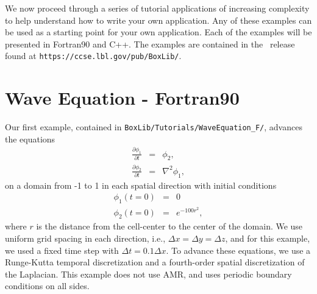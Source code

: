 We now proceed through a series of tutorial applications of increasing complexity
to help understand how to write your own application.  Any of these examples
can be used as a starting point for your own application.  Each of the examples
will be presented in Fortran90 and C++.  The examples are contained in the \BoxLib\
release found at {\tt https://ccse.lbl.gov/pub/BoxLib/}.

\section{Wave Equation - Fortran90}
Our first example, contained in {\tt BoxLib/Tutorials/WaveEquation\_F/}, advances the 
equations
\begin{eqnarray}
\frac{\partial\phi_1}{\partial t} &=& \phi_2, \\
\frac{\partial\phi_2}{\partial t} &=& \nabla^2\phi_1,
\end{eqnarray}
on a domain from -1 to 1 in each spatial direction with initial conditions
\begin{eqnarray}
\phi_1(t=0) &=& 0 \\
\phi_2(t=0) &=& e^{-100r^2},
\end{eqnarray}
where $r$ is the distance from the cell-center to the center of the domain.
We use uniform grid spacing in each direction, i.e., $\Delta x = \Delta y = \Delta z$,
and for this example, we used a fixed time step with $\Delta t = 0.1\Delta x$.
To advance these equations, we use a Runge-Kutta temporal discretization and a 
fourth-order spatial discretization of the Laplacian.  This example does not use AMR, 
and uses periodic boundary conditions on all sides.

